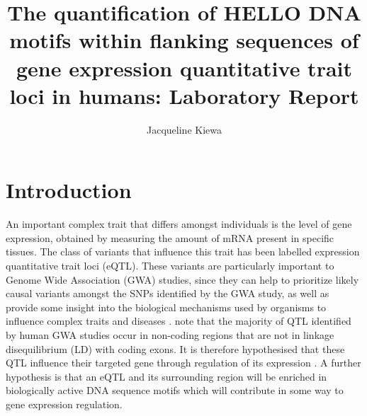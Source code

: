 \documentclass[12pt]{article}
\begin{document}


\title{The quantification of HELLO DNA motifs within flanking sequences of gene expression quantitative trait loci in humans: Laboratory Report}


\author{Jacqueline Kiewa}





\doublespacing
\maketitle
\clearpage
\tableofcontents


\clearpage
\section{Introduction}

An important complex trait that differs amongst individuals is the level of gene expression, obtained by measuring the amount of mRNA present in specific tissues. The class of variants that influence this trait has been labelled expression quantitative trait loci (eQTL). These variants are particularly important to Genome Wide Association (GWA) studies, since they can help to prioritize likely causal variants amongst the SNPs identified by the GWA study, as well as provide some insight into the biological mechanisms used by organisms to influence complex traits and diseases \citep{albert2015role}. \citet{albert2015role} note that the majority of QTL identified by human GWA studies occur in non-coding regions that are not in linkage disequilibrium (LD) with coding exons. It is therefore hypothesised that these QTL influence their targeted gene through regulation of its expression \citep{nica2013expression}. A further hypothesis is that an eQTL and its surrounding region will be enriched in biologically active DNA sequence motifs which will contribute in some way to gene expression regulation. 
\end{document}
